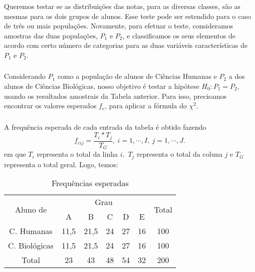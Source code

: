 \documentclass[14pt,aspectratio=1610]{beamer}
\newcommand{\Ho}{\ensuremath{H_{0}}}
\begin{document}
\begin{frame}{}
\frametitle{}
\begin{block}{}
\justifying
Queremos testar se as distribuições das notas, para as diversas classes, são as mesmas para os dois grupos de alunos. Esse teste pode ser estendido para o caso de três ou mais populações. Novamente, para efetuar o teste, consideramos amostras das duas populações, $P_1$ e $P_2$, e classificamos os seus elementos de acordo com certo número de categorias para as duas variáveis características de $P_1$ e $P_2.$
\end{block}
\end{frame}

\begin{frame}{}
\frametitle{}
\begin{block}{}
\justifying
Considerando $P_1$ como a população de alunos de Ciências Humanas e $P_2$ a dos alunos de Ciências Biológicas, nosso objetivo é testar a hipótese $\Ho : P_1 = P_2,$
usando os resultados amostrais da Tabela anterior. Para isso, precisamos encontrar os
valores esperados $f_{e}$, para aplicar a fórmula do $\chi^{2}.$

\end{block}
\end{frame}

\begin{frame}{}
\frametitle{}
\begin{block}{}
\justifying
A frequência esperada de cada entrada da tabela é obtido fazendo 
$$f_{eij}=\dfrac{T_{i}*T_{j}}{T_{G}},\ i=1,\cdots,I,\ j=1,\cdots, J.$$
em que $T_{i}$ representa o total da linha $i,$ $T_{j}$ representa o total da coluna $j$ e $T_{G}$ representa o total geral. Logo, temos:
\begin{table}{}
\caption{Frequências esperadas}
\begin{tabular}{c|c|c|c|c|c|c}
\multirow{2}{*}{Aluno de}&\multicolumn{5}{c}{Grau}&\multirow{2}{*}{Total}\\
\cline{2-6}
                         &A&B&C&D&E&\\
\hline
C. Humanas    &11,5& 21,5& 24& 27& 16& 100\\
C. Biológicas &11,5& 21,5& 24& 27& 16&100\\
\hline
Total         &23& 43& 48& 54& 32& 200\\
\hline
\end{tabular}
\end{table}
\end{block}
\end{frame}
\end{document}
